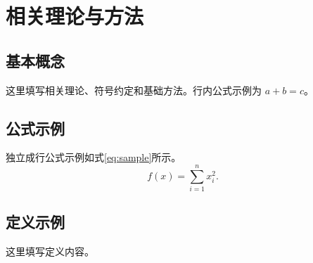 
\chapter{相关理论与方法}
\label{ch:method}

\section{基本概念}

这里填写相关理论、符号约定和基础方法。行内公式示例为 $a+b=c$。

\section{公式示例}

独立成行公式示例如式\eqref{eq:sample}所示。
\begin{equation}
  f(x)=\sum_{i=1}^{n} x_i^2 .
  \label{eq:sample}
\end{equation}

\section{定义示例}

\begin{definition}
这里填写定义内容。
\end{definition}
